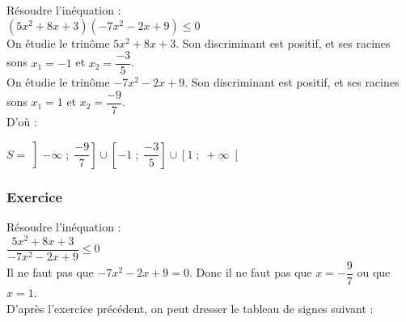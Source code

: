 Résoudre l'inéquation : \\

$\left(5x^2 +8x +3\right)\left(-7x^2 -2x + 9\right) \leqslant 0$ \\

On étudie le trinôme $5x^2 +8x +3$. Son discriminant est positif, et ses racines sons $x_1 = -1$ et $x_2 = \dfrac{-3}{5}$. \\

On étudie le trinôme $-7x^2 -2x + 9$. Son discriminant est positif, et ses racines sons $x_1 = 1$ et $x_2 = \dfrac{-9}{7}$. \\

D'où : \\


\vspace*{.3cm}

$S = \left]-\infty \; ; \; \dfrac{-9}{7}\right]\cup\left[-1 \; ; \; \dfrac{-3}{5}\right]\cup \left[1 \; ; \; +\infty\right[ $ 

\subsubsection{Exercice }

Résoudre l'inéquation :\\

$\dfrac{5x^2 + 8x + 3}{-7x^2 - 2x + 9} \leqslant 0$ \\

Il ne faut pas que $-7x^2 - 2x + 9 = 0$. Donc il ne faut pas que $x = -\dfrac{9}{7}$ ou que $x = 1$. \\

D'après l'exercice précédent, on peut dresser le tableau de signes suivant : \\


